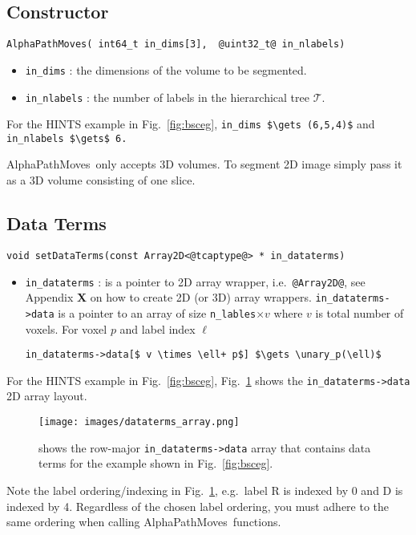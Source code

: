 \documentclass[12pt,letterpaper]{article}
\makeatletter
\def\APM{{\ttfamily AlphaPathMoves}~}
\def\Tree{\mathcal{T}}
\def\Tree{\mathcal{T}}
\def\unary{D}
\def\keyhl[#1]{\lstinline{@#1@}}
\makeatother
\begin{document}
\subsection{Constructor}
\label{sc:constructor}
\begin{lstlisting}
AlphaPathMoves( int64_t in_dims[3],  @uint32_t@ in_nlabels)
\end{lstlisting}
\begin{itemize}
\item  \lstinline{in_dims} : the dimensions of the volume to be segmented.
\item  \lstinline{in_nlabels} : the number of labels in the hierarchical tree $\Tree.$
\end{itemize}
For the HINTS example in Fig.~\ref{fig:bsceg}, \lstinline[mathescape=true]{in_dims $\gets (6,5,4)$} and \lstinline[mathescape=true]{in_nlabels $\gets$ 6.}
\begin{tcolorbox}
\APM only accepts 3D volumes. To segment 2D image simply pass it as a 3D volume consisting of one slice.
\end{tcolorbox}

\subsection{Data Terms}
\label{sc:dataterms}
\begin{lstlisting}
void setDataTerms(const Array2D<@tcaptype@> * in_dataterms)
\end{lstlisting}
\begin{itemize}
\item  \lstinline{in_dataterms} : is a pointer to 2D array wrapper, i.e.~\keyhl[Array2D], see Appendix \textbf{X} on how to create 2D (or 3D) array wrappers. \lstinline{in_dataterms->data} is a pointer to an array of size \lstinline{n_lables}$\times v$ where $v$ is total number of voxels. For voxel $p$ and label index $\ell$
    \begin{center}
    \lstinline[mathescape=true]{in_dataterms->data[$ v \times \ell+ p$] $\gets \unary_p(\ell)$}
    \end{center}
\end{itemize}
For the HINTS example in Fig.~\ref{fig:bsceg}, Fig.~\ref{fig:eg_dataterms} shows the \lstinline{in_dataterms->data} 2D array layout.
\begin{figure}[h]
\centering
\texttt{[image: images/dataterms\_array.png]}
\caption{shows the row-major \lstinline{in_dataterms->data} array that contains data terms for the example shown in Fig.~\ref{fig:bsceg}.}
\label{fig:eg_dataterms}
\end{figure}
\begin{tcolorbox}
Note the label ordering/indexing in Fig.~\ref{fig:eg_dataterms}, e.g.~label R is indexed by 0 and D is indexed by 4. Regardless of the chosen label ordering, you must adhere to the same ordering when calling \APM functions.
\end{tcolorbox}
\end{document}
